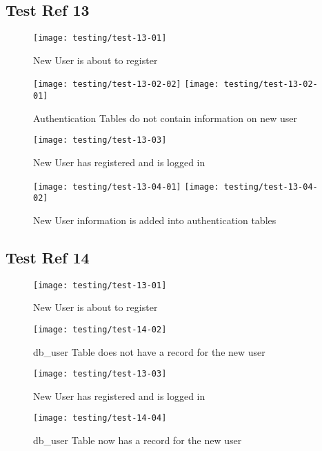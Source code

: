 \subsection{Test Ref 13}

\begin{figure}[H]
\centering
\texttt{[image: testing/test-13-01]}
\caption{New User is about to register}
\label{test-13-01}
\end{figure}

\begin{figure}[H]
\centering
\texttt{[image: testing/test-13-02-02]}
\texttt{[image: testing/test-13-02-01]}
\caption{Authentication Tables do not contain information on new user}
\label{test-13-02}
\end{figure}

\begin{figure}[H]
\centering
\texttt{[image: testing/test-13-03]}
\caption{New User has registered and is logged in}
\label{test-13-03}
\end{figure}

\begin{figure}[H]
\centering
\texttt{[image: testing/test-13-04-01]}
\texttt{[image: testing/test-13-04-02]}
\caption{New User information is added into authentication tables}
\label{test-13-04}
\end{figure}

\subsection{Test Ref 14}

\begin{figure}[H]
\centering
\texttt{[image: testing/test-13-01]}
\caption{New User is about to register}
\label{test-14-01}
\end{figure}

\begin{figure}[H]
\centering
\texttt{[image: testing/test-14-02]}
\caption{db\_user Table does not have a record for the new user}
\label{test-14-02}
\end{figure}

\begin{figure}[H]
\centering
\texttt{[image: testing/test-13-03]}
\caption{New User has registered and is logged in}
\label{test-14-03}
\end{figure}

\begin{figure}[H]
\centering
\texttt{[image: testing/test-14-04]}
\caption{db\_user Table now has a record for the new user}
\label{test-14-02}
\end{figure}

